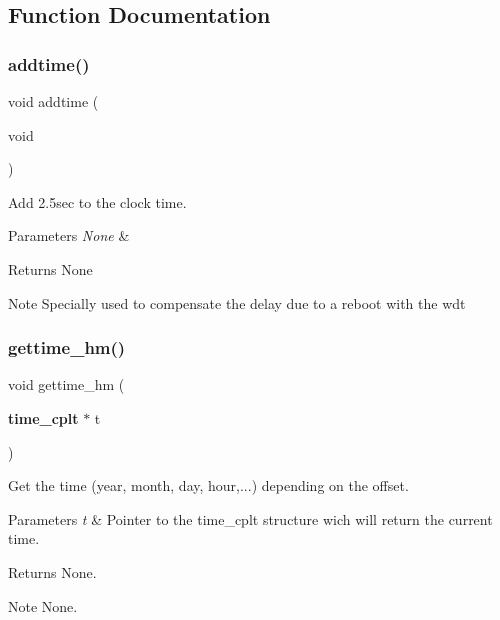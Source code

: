 \subsection{Function Documentation}
\mbox{\label{time__hm_8h_a17ec1ac87ef501b1e19143e0a820b51d}} 
\subsubsection{addtime()}
{\footnotesize\ttfamily void addtime (\begin{DoxyParamCaption}\item[{void}]{ }\end{DoxyParamCaption})}



Add 2.\+5sec to the clock time. 


\begin{DoxyParams}{Parameters}
{\em None} & \\
\hline
\end{DoxyParams}
\begin{DoxyReturn}{Returns}
None
\end{DoxyReturn}
\begin{DoxyNote}{Note}
Specially used to compensate the delay due to a reboot with the wdt 
\end{DoxyNote}
\mbox{\label{time__hm_8h_af2f292a8abbb851c01a5f80843259242}} 
\subsubsection{gettime\_hm()}
{\footnotesize\ttfamily void gettime\+\_\+hm (\begin{DoxyParamCaption}\item[{\textbf{ time\+\_\+cplt} $\ast$}]{t }\end{DoxyParamCaption})}



Get the time (year, month, day, hour,...) depending on the offset. 


\begin{DoxyParams}{Parameters}
{\em t} & Pointer to the time\+\_\+cplt structure wich will return the current time.\\
\hline
\end{DoxyParams}
\begin{DoxyReturn}{Returns}
None.
\end{DoxyReturn}
\begin{DoxyNote}{Note}
None. 
\end{DoxyNote}
\mbox{\label{time__hm_8h_a99a092165ba432f4205c2b38221cc3fa}} 
